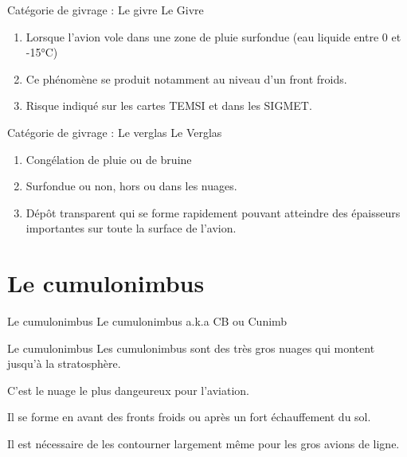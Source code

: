 \documentclass{beamer}
\begin{document}
\begin{frame}{Catégorie de givrage : Le givre}
  Le Givre
  \pause

  \begin{enumerate}
    \item Lorsque l'avion vole dans une zone de pluie surfondue (eau liquide entre 0 et -15°C) \pause
    \item Ce phénomène se produit notamment au niveau d'un front froids. \pause
    \item Risque indiqué sur les cartes TEMSI et dans les SIGMET.
  \end{enumerate}
\end{frame}

\begin{frame}{Catégorie de givrage : Le verglas}
  Le Verglas
  \pause

  \begin{enumerate}
    \item Congélation de pluie ou de bruine \pause
    \item Surfondue ou non, hors ou dans les nuages. \pause
    \item Dépôt transparent qui se forme rapidement pouvant atteindre des épaisseurs importantes sur toute la surface de l'avion.
  \end{enumerate}
\end{frame}

\section{Le cumulonimbus}
\begin{frame}{Le cumulonimbus}
  \LARGE{Le cumulonimbus a.k.a CB ou Cunimb}
\end{frame}

\begin{frame}{Le cumulonimbus}
  Les cumulonimbus sont des très gros nuages qui montent jusqu'à la stratosphère.

  \pause

  C'est le nuage le plus dangeureux pour l'aviation.

  \pause

  Il se forme en avant des fronts froids ou après un fort échauffement du sol.

  \pause
  
  Il est nécessaire de les contourner largement même pour les gros avions de ligne.
\end{frame}
\end{document}
